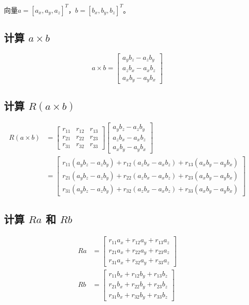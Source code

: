 \documentclass[12pt,a4paper]{article}
\begin{document}
向量$a = [a_x, a_y, a_z]^T$，$b = [b_x, b_y, b_z]^T$。

\subsection{计算 $a \times b$}

\begin{equation}
a \times b = \begin{bmatrix}
a_y b_z - a_z b_y \\
a_z b_x - a_x b_z \\
a_x b_y - a_y b_x
\end{bmatrix}
\end{equation}

\subsection{计算 $R(a \times b)$}

\begin{align}
R(a \times b) &= \begin{bmatrix}
r_{11} & r_{12} & r_{13} \\
r_{21} & r_{22} & r_{23} \\
r_{31} & r_{32} & r_{33}
\end{bmatrix} \begin{bmatrix}
a_y b_z - a_z b_y \\
a_z b_x - a_x b_z \\
a_x b_y - a_y b_x
\end{bmatrix} \\
&= \begin{bmatrix}
r_{11}(a_y b_z - a_z b_y) + r_{12}(a_z b_x - a_x b_z) + r_{13}(a_x b_y - a_y b_x) \\
r_{21}(a_y b_z - a_z b_y) + r_{22}(a_z b_x - a_x b_z) + r_{23}(a_x b_y - a_y b_x) \\
r_{31}(a_y b_z - a_z b_y) + r_{32}(a_z b_x - a_x b_z) + r_{33}(a_x b_y - a_y b_x)
\end{bmatrix}
\end{align}

\subsection{计算 $Ra$ 和 $Rb$}

\begin{align}
Ra &= \begin{bmatrix}
r_{11} a_x + r_{12} a_y + r_{13} a_z \\
r_{21} a_x + r_{22} a_y + r_{23} a_z \\
r_{31} a_x + r_{32} a_y + r_{33} a_z
\end{bmatrix} \\
Rb &= \begin{bmatrix}
r_{11} b_x + r_{12} b_y + r_{13} b_z \\
r_{21} b_x + r_{22} b_y + r_{23} b_z \\
r_{31} b_x + r_{32} b_y + r_{33} b_z
\end{bmatrix}
\end{align}
\end{document}
